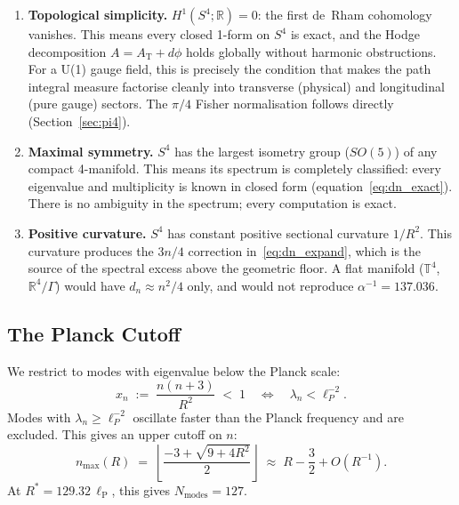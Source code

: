 \documentclass[12pt,a4paper]{article}
\newcommand{\lP}{\ell_{\mathrm{P}}}
\begin{document}
\begin{enumerate}
\item \textbf{Topological simplicity.}
  $H^1(S^4;\mathbb{R}) = 0$: the first de~Rham
  cohomology vanishes.
  This means every closed 1-form on $S^4$ is exact,
  and the Hodge decomposition
  $A = A_{\mathrm{T}} + d\phi$
  holds globally without harmonic obstructions.
  For a U(1) gauge field, this is precisely the
  condition that makes the path integral measure
  factorise cleanly into transverse (physical)
  and longitudinal (pure gauge) sectors.
  The $\pi/4$ Fisher normalisation follows directly
  (Section~\ref{sec:pi4}).

\item \textbf{Maximal symmetry.}
  $S^4$ has the largest isometry group ($SO(5)$)
  of any compact 4-manifold.
  This means its spectrum is completely classified:
  every eigenvalue and multiplicity is known in
  closed form (equation~\eqref{eq:dn_exact}).
  There is no ambiguity in the spectrum; every
  computation is exact.

\item \textbf{Positive curvature.}
  $S^4$ has constant positive sectional curvature $1/R^2$.
  This curvature produces the $3n/4$ correction
  in~\eqref{eq:dn_expand}, which is the source
  of the spectral excess above the geometric floor.
  A flat manifold ($\mathbb{T}^4$, $\mathbb{R}^4/\Gamma$)
  would have $d_n \approx n^2/4$ only, and would
  not reproduce $\alpha^{-1} = 137.036$.
\end{enumerate}

\subsection{The Planck Cutoff}
\label{sec:cutoff}

\begin{Tbox}
We restrict to modes with eigenvalue below the
Planck scale:
\begin{equation}
  x_n \;:=\; \frac{n(n+3)}{R^2} \;<\; 1
  \quad\Longleftrightarrow\quad
  \lambda_n < \ell_P^{-2}.
\label{eq:cutoff}
\end{equation}
Modes with $\lambda_n \geq \ell_P^{-2}$ oscillate
faster than the Planck frequency and are excluded.
This gives an upper cutoff on $n$:
\begin{equation}
  n_{\max}(R)
  \;=\; \left\lfloor
    \frac{-3 + \sqrt{9+4R^2}}{2}
  \right\rfloor
  \;\approx\; R - \frac{3}{2} + O(R^{-1}).
\label{eq:nmax}
\end{equation}
At $R^* = 129.32\,\lP$, this gives $N_{\mathrm{modes}} = 127$.
\end{Tbox}
\end{document}
